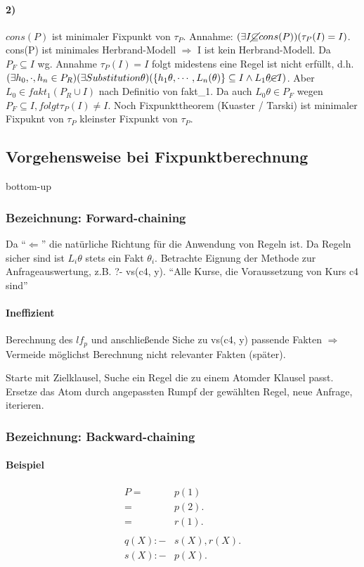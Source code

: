 \documentclass[12pt, a4paper]{article}
\begin{document}
\paragraph{2)} $cons(P)$ ist minimaler Fixpunkt von $\tau_P$.
Annahme: $(\exists I \cancel{\subseteq} cons(P))(\tau_P(I) = I)$.
cons(P) ist minimales Herbrand-Modell $\Rightarrow$ I ist kein Herbrand-Modell. Da $P_F \subseteq I$ wg. Annahme $\tau_P(I) = I$ folgt midestens eine Regel ist nicht erfüllt, d.h. $(\exists h_0, \cdot,h_n \in P_R)(\exists Substitution \theta)(\{ h_1\theta, \cdots, L_n(\theta)\} \subseteq I \wedge L_1 \theta \cancel{\in} I)$. Aber $L_0 \in fakt_1(P_R \cup I)$ nach Definitio von fakt\_1.
Da auch $L_0 \theta \in P_F$ wegen $P_F \subseteq I, folgt \tau_P(I) \neq I$. Noch Fixpunkttheorem (Kuaster / Tarski) ist minimaler Fixpuknt von $\tau_P$ kleinster Fixpunkt von $\tau_P$. 

\subsection{Vorgehensweise bei Fixpunktberechnung} bottom-up

\subsubsection{Bezeichnung: Forward-chaining}Da ``$\Leftarrow$'' die natürliche Richtung für die Anwendung von Regeln ist.
Da Regeln sicher sind ist $L_i \theta$ stets ein Fakt $\theta_i$.
Betrachte Eignung der Methode zur Anfrageauswertung, z.B. ?- vs(c4, y). ``Alle Kurse, die Voraussetzung von Kurs c4 sind''

\paragraph{Ineffizient} Berechnung des $lf_p$ und anschließende Siche zu vs(c4, y) passende Fakten $\Rightarrow$ Vermeide möglichst Berechnung nicht relevanter Fakten (später).

Starte mit Zielklausel, Suche ein Regel die zu einem Atomder Klausel passt. Ersetze das Atom durch angepassten Rumpf der gewählten Regel, neue Anfrage, iterieren.

\subsubsection{Bezeichnung: Backward-chaining}
\paragraph{Beispiel}
\begin{equation}
\begin{split}
P = &p(1) \\
= &p(2). \\
= &r(1). \\
&\\
q(X) :- &s(X), r(X). \\
s(X) :- &p(X).
\end{split}
\end{equation}
\end{document}
